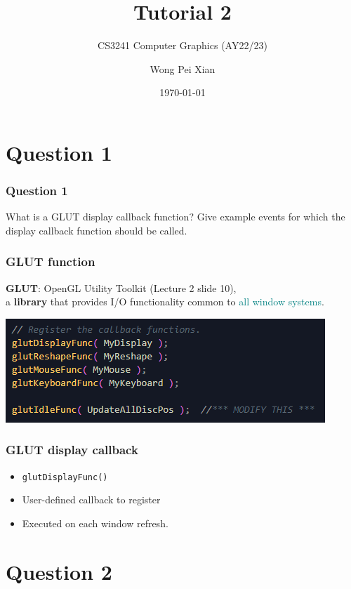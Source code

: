 \documentclass{beamer}
\title{Tutorial 2}
\subtitle{CS3241 Computer Graphics (AY22/23)}
\date{\today}
\author{Wong Pei Xian}
\institute[]{\email{e0389023@u.nus.edu}}
\begin{document}
\frame[plain]{\titlepage}

\section{Question 1}

\begin{frame}
    \frametitle{Question 1}
    What is a GLUT display callback function?  
    Give example events for which the display callback function should be called.
\end{frame}

\begin{frame}
    \frametitle{GLUT function}

    \begin{tcolorbox}
        \textbf{GLUT}: OpenGL Utility Toolkit (Lecture 2 slide 10), \\
        
        a \textbf{library} that provides I/O functionality common to \textcolor{teal}{all window systems}.
    \end{tcolorbox}

    \begin{center}
        \includegraphics[]{q1-glut-callbacks.png}
    \end{center}

\end{frame}

\begin{frame}
    \frametitle{GLUT display callback}

    \begin{itemize}
        \item \texttt{glutDisplayFunc()}
        \item User-defined callback to register
        \item Executed on each window refresh.
    \end{itemize}

\end{frame}

\section{Question 2}
\end{document}
